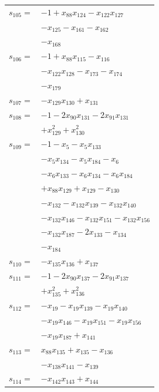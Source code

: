 \begin{longtable}{@{}r@{\;}l@{}}
\(s_{105}=\) & \(\displaystyle -1 +x_{88}x_{124} -x_{122}x_{127}\) \\
 & \(\displaystyle -x_{125} -x_{161} -x_{162}\) \\
 & \(\displaystyle -x_{168}\) \\[3pt]
\(s_{106}=\) & \(\displaystyle -1 +x_{88}x_{115} -x_{116}\) \\
 & \(\displaystyle -x_{122}x_{128} -x_{173} -x_{174}\) \\
 & \(\displaystyle -x_{179}\) \\[3pt]
\(s_{107}=\) & \(\displaystyle -x_{129}x_{130} +x_{131}\) \\[3pt]
\(s_{108}=\) & \(\displaystyle -1 -2x_{90}x_{131} -2x_{91}x_{131}\) \\
 & \(\displaystyle +x_{129}^{2} +x_{130}^{2}\) \\[3pt]
\(s_{109}=\) & \(\displaystyle -1 -x_{5} -x_{5}x_{133}\) \\
 & \(\displaystyle -x_{5}x_{134} -x_{5}x_{184} -x_{6}\) \\
 & \(\displaystyle -x_{6}x_{133} -x_{6}x_{134} -x_{6}x_{184}\) \\
 & \(\displaystyle +x_{88}x_{129} +x_{129} -x_{130}\) \\
 & \(\displaystyle -x_{132} -x_{132}x_{139} -x_{132}x_{140}\) \\
 & \(\displaystyle -x_{132}x_{146} -x_{132}x_{151} -x_{132}x_{156}\) \\
 & \(\displaystyle -x_{132}x_{187} -2x_{133} -x_{134}\) \\
 & \(\displaystyle -x_{184}\) \\[3pt]
\(s_{110}=\) & \(\displaystyle -x_{135}x_{136} +x_{137}\) \\[3pt]
\(s_{111}=\) & \(\displaystyle -1 -2x_{90}x_{137} -2x_{91}x_{137}\) \\
 & \(\displaystyle +x_{135}^{2} +x_{136}^{2}\) \\[3pt]
\(s_{112}=\) & \(\displaystyle -x_{19} -x_{19}x_{139} -x_{19}x_{140}\) \\
 & \(\displaystyle -x_{19}x_{146} -x_{19}x_{151} -x_{19}x_{156}\) \\
 & \(\displaystyle -x_{19}x_{187} +x_{141}\) \\[3pt]
\(s_{113}=\) & \(\displaystyle x_{88}x_{135} +x_{135} -x_{136}\) \\
 & \(\displaystyle -x_{138}x_{141} -x_{139}\) \\[3pt]
\(s_{114}=\) & \(\displaystyle -x_{142}x_{143} +x_{144}\) \\[3pt]

\end{longtable}
